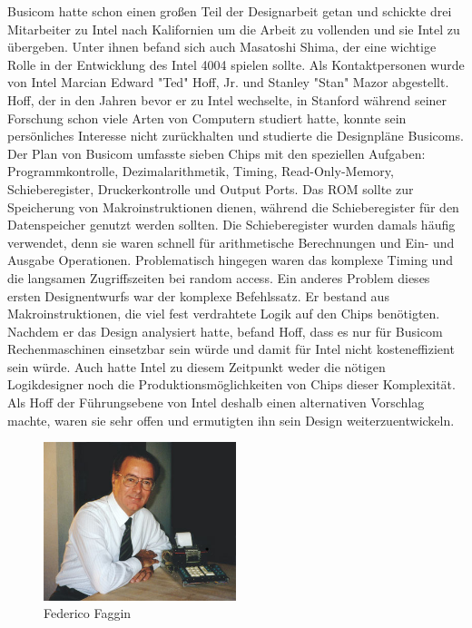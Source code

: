 Busicom hatte schon einen großen Teil der Designarbeit getan und schickte drei Mitarbeiter zu Intel nach Kalifornien um die Arbeit zu vollenden und sie Intel zu übergeben.
Unter ihnen befand sich auch Masatoshi Shima, der eine wichtige Rolle in der Entwicklung des Intel 4004 spielen sollte. Als Kontaktpersonen wurde von Intel Marcian Edward "Ted" Hoff, Jr. und Stanley "Stan" Mazor abgestellt. Hoff, der in den Jahren bevor er zu Intel wechselte, in Stanford während seiner Forschung schon viele Arten von Computern studiert hatte, konnte sein persönliches Interesse nicht zurückhalten und studierte die Designpläne Busicoms. Der Plan von Busicom umfasste sieben Chips mit den speziellen Aufgaben: Programmkontrolle, Dezimalarithmetik, Timing, Read-Only-Memory, Schieberegister, Druckerkontrolle und Output Ports. Das ROM sollte zur Speicherung von Makroinstruktionen dienen, während die Schieberegister für den Datenspeicher genutzt werden sollten. Die Schieberegister wurden damals häufig verwendet, denn sie waren schnell für arithmetische Berechnungen und Ein- und Ausgabe Operationen. Problematisch hingegen waren das komplexe Timing und die langsamen Zugriffszeiten bei random access. Ein anderes Problem dieses ersten Designentwurfs war der komplexe Befehlssatz. Er bestand aus Makroinstruktionen, die viel fest verdrahtete Logik auf den Chips benötigten.
Nachdem er das Design analysiert hatte, befand Hoff, dass es nur für Busicom Rechenmaschinen einsetzbar sein würde und damit für Intel nicht kosteneffizient sein würde. Auch hatte Intel zu diesem Zeitpunkt weder die nötigen Logikdesigner noch die Produktionsmöglichkeiten von Chips dieser Komplexität. Als Hoff der Führungsebene von Intel deshalb einen alternativen Vorschlag machte, waren sie sehr offen und ermutigten ihn sein Design weiterzuentwickeln.
\newline
\vspace{-23pt}
\begin{figure}
	\vspace{-5pt}
	\includegraphics[width=0.5\textwidth]{figures/faggin.jpg}
	\caption{Federico Faggin}
	\label{fig:creators2}
	\vspace{-5pt}
\end{figure} 

